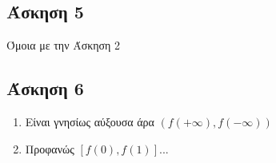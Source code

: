 \documentclass[greek]{beamer}
\begin{document}
\subsection{Άσκηση 5}
\begin{frame}[label=Λύση5]
 Όμοια με την Άσκηση 2

 \hyperlink{Άσκηση5}{}
\end{frame}

\subsection{Άσκηση 6}
\begin{frame}[label=Λύση6]
 \begin{enumerate}
  \item Είναι γνησίως αύξουσα άρα $(f(+\infty),f(-\infty))$
  \item Προφανώς $[f(0),f(1)]$...
 \end{enumerate}

 \hyperlink{Άσκηση6}{}
\end{frame}
\end{document}

